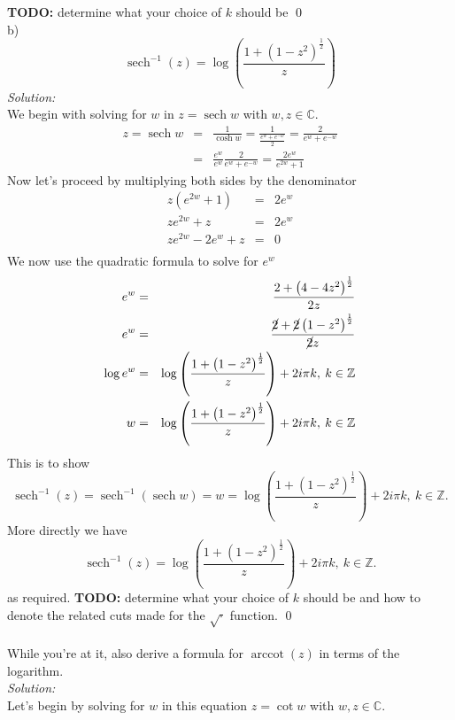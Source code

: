 \documentclass[10pt]{amsart}
\DeclareMathOperator{\sech}{sech}
\theoremstyle{nonumberplain}
\begin{document}
\begin{enumerate}[label={\bf {\arabic*}:}]
\textbf{TODO:} determine what your choice of $k$ should be \qed \\
b) $$\sech^{-1}(z) = \log \left(\frac{1 + (1 - z^2)^{\frac{1}{2}}}{z}\right)$$
\textit{Solution:} \\
We begin with solving for $w$ in $z = \sech{w}$ with $w, z \in \mathbb{C}$. 
\begin{eqnarray*}
z = \sech{w} &=& \frac{1}{\cosh w} = \frac{1}{\frac{e^{w} + e^{-w}}{2}} = \frac{2}{e^{w} + e^{-w}} \\
	  &=& \frac{e^{w}}{e^{w}} \frac{2}{e^{w} + e^{-w}} = \frac{ 2e^{w}}{ e^{2w} + 1 }
\end{eqnarray*}
Now let's proceed by multiplying both sides by the denominator
\begin{eqnarray*}
z\left( e^{2w} + 1 \right) &=&  2e^{w}\\
ze^{2w} + z &=&  2e^{w}\\
ze^{2w} - 2e^{w}+ z &=&  0\\
\end{eqnarray*}
We now use the quadratic formula to solve for $e^{w}$
\begin{eqnarray*}
e^{w} &=& \frac{2 + \left(4 - 4z^2\right)^{\frac{1}{2}}}{2z} \\
e^{w} &=& \frac{\cancel2 + \cancel2\left(1 - z^2\right)^{\frac{1}{2}}}{\cancel2z} \\
\log e^{w} &=& \log\left(\frac{1 + \left(1 - z^2\right)^{\frac{1}{2}}}{z} \right) + 2i\pi k, \: k \in \mathbb{Z} \\
w &=& \log\left(\frac{1 + \left(1 - z^2\right)^{\frac{1}{2}}}{z} \right) + 2i\pi k, \: k \in \mathbb{Z} \\
\end{eqnarray*}
This is to show
$$\sech^{-1}(z) = \sech^{-1}(\sech w) = w = \log\left(\frac{1 + \left(1 - z^2\right)^{\frac{1}{2}}}{z} \right) + 2i\pi k, \: k \in \mathbb{Z}.$$
More directly we have 
$$\sech^{-1}(z) = \log\left(\frac{1 + \left(1 - z^2\right)^{\frac{1}{2}}}{z} \right) + 2i\pi k, \: k \in \mathbb{Z}.$$
as required. 
\textbf{TODO:} determine what your choice of $k$ should be and how to denote the related cuts made for the $\sqrt{\cdot}$ function.
\qed \\
\\
While you're at it, also derive a formula for $\operatorname{arccot}(z)$ in terms of the logarithm. \\
\textit{Solution:} \\
Let's begin by solving for $w$ in this equation $z = \cot w$ with $w, z \in \mathbb{C}$.
\begin{eqnarray*}

\end{eqnarray*}
\end{enumerate}
\end{document}
